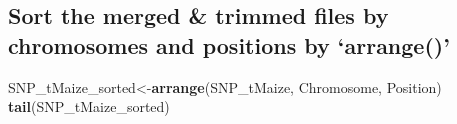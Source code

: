 \documentclass[]{article}
\newenvironment{Shaded}{\begin{snugshade}}{\end{snugshade}}
\newcommand{\KeywordTok}[1]{\textcolor[rgb]{0.13,0.29,0.53}{\textbf{#1}}}
\newcommand{\NormalTok}[1]{#1}
\begin{document}
\subsection{\texorpdfstring{Sort the merged \& trimmed files by
chromosomes and positions by
`arrange()'}{Sort the merged \& trimmed files by chromosomes and positions by arrange()}}\label{sort-the-merged-trimmed-files-by-chromosomes-and-positions-by-arrange}

\begin{Shaded}
\begin{Highlighting}[]
\NormalTok{SNP_tMaize_sorted<-}\KeywordTok{arrange}\NormalTok{(SNP_tMaize, Chromosome, Position)}
\KeywordTok{tail}\NormalTok{(SNP_tMaize_sorted)}
\end{Highlighting}
\end{Shaded}
\end{document}
